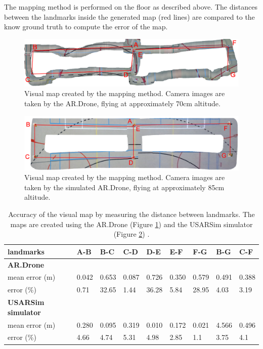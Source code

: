 The mapping method is performed on the floor as described above. The distances between the landmarks inside the generated map (red lines) are compared to the know ground truth to compute the error of the map.

\begin{figure}[htb]
\centering
\includegraphics[width=\linewidth]{images/map_ardrone.png}
\caption{Visual map created by the mapping method. Camera images are taken by the AR.Drone, flying at approximately 70cm altitude.}
\label{fig:res_mapping_ardrone}
\end{figure}

\begin{figure}[htb]
\centering
\includegraphics[width=14.8cm]{images/map_usarsim.png}
\caption{Visual map created by the mapping method. Camera images are taken by the simulated AR.Drone, flying at approximately 85cm altitude.}
\label{fig:res_mapping_usarsim}
\end{figure}


\begin{table}[htb!]
    \centering
    \begin{tabular}
        { | l | l | l | l | l | l | l | l | l |} 
	\hline
	landmarks & A-B & B-C & C-D & D-E & E-F & F-G & B-G & C-F \\
        \hline
        \textbf{AR.Drone} & & & & & & & & \\
	mean error (m) & 0.042 & 0.653 & 0.087 & 0.726 & 0.350 & 0.579 & 0.491 & 0.388  \\
	error (\%) & 0.71 & 32.65 & 1.44 & 36.28 & 5.84 & 28.95 & 4.03 & 3.19\\
	\hline
	\textbf{USARSim simulator} & & & & & & & & \\
	mean error (m) & 0.280 & 0.095 & 0.319 & 0.010 & 0.172 & 0.021 & 4.566 & 0.496 \\
	error (\%) & 4.66 & 4.74 & 5.31 & 4.98 & 2.85 & 1.1 & 3.75 & 4.1 \\
	\hline
    \end{tabular}
    \caption{Accuracy of the visual map by measuring the distance between landmarks. The maps are created using the AR.Drone (Figure \ref{fig:res_mapping_ardrone}) and the USARSim simulator (Figure \ref{fig:res_mapping_usarsim}) .}
    \label{tab:res_mapping}
\end{table}

